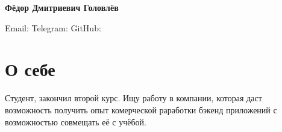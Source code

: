 \documentclass[letterpaper,10pt]{article}
\makeatletter
\newcommand{\tframed}[2][]{\tikz[baseline=(h.base)]\node[rndblock,#1] (h) {\color{black}{#2}};}
\newcommand*{\mystrut}{\rule[-0.2\baselineskip]{0pt}{0.8\baselineskip}}
\newcommand{\skill}[1]{\tframed[lightgray]{\mystrut#1}}
\newcommand{\resumeExpSubheading}[5]{
  \vspace{3pt}
  \item
    \begin{tabular*}{0.97\textwidth}{l@{\extracolsep{\fill}}r}
      \vspace{2pt} \textbf{#1}  & \textcolor{mygray}{\small #2} \\
      \textit{#3} & \textcolor{mygray}{\textit{\small #4}} \\
      {\scriptsize#5}
    \end{tabular*}\vspace{3pt}
}
\newcommand{\resumeSubHeadingListStart}{\begin{itemize}[leftmargin=*]}
\newcommand{\resumeSubHeadingListEnd}{\end{itemize}}
\newcommand{\resumeDesc}[1]{\begin{adjustwidth}{5pt}{0pt}\vspace{-2pt}{#1}\end{adjustwidth}}
\newcommand{\ExternalLink}{
    \tikz[x=1.2ex, y=1.2ex, baseline=-0.05ex]{
        \begin{scope}[x=1ex, y=1ex]
            \clip (-0.1,-0.1) 
                --++ (-0, 1.2) 
                --++ (0.6, 0) 
                --++ (0, -0.6) 
                --++ (0.6, 0) 
                --++ (0, -1);
            \path[draw, 
                line width = 0.5, 
                rounded corners=0.5] 
                (0,0) rectangle (1,1);
        \end{scope}
        \path[draw, line width = 0.5] (0.5, 0.5) 
            -- (1, 1);
        \path[draw, line width = 0.5] (0.6, 1) 
            -- (1, 1) -- (1, 0.6);
        }
    }
\newcommand{\MYhref}[3][Blue1]{\href{#2}{\color{#1}{#3}}}
\makeatother
\begin{document}

\begin{center}\textbf{\Large Фёдор Дмитриевич Головлёв}\end{center}
\vspace{-12pt}
\begin{center}
Email: \MYhref{mailto:fdgolovlev@gmail.com}{fdgolovlev@gmail.com} \quad
Telegram: \MYhref{https://t.me/Erruano}{Erruano} \quad
GitHub: \MYhref{https://github.com/Eruano-prog}{Eruano-prog}
\end{center}

\vspace{-10pt}
\section{О себе}
\resumeSubHeadingListStart
\justifying
Студент, закончил второй курс. Ищу работу в компании, которая даст возможность получить опыт комерческой раработки бэкенд приложений с возможностью совмещать её с учёбой.
\resumeSubHeadingListEnd

      
\end{document}
